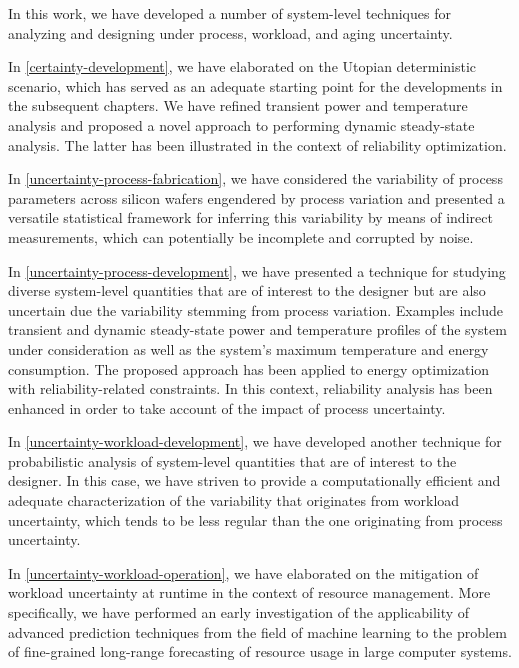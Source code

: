 In this work, we have developed a number of system-level techniques for
analyzing and designing under process, workload, and aging uncertainty.

In \cref{certainty-development}, we have elaborated on the Utopian deterministic
scenario, which has served as an adequate starting point for the developments in
the subsequent chapters. We have refined transient power and temperature
analysis and proposed a novel approach to performing dynamic steady-state
analysis. The latter has been illustrated in the context of reliability
optimization.

In \cref{uncertainty-process-fabrication}, we have considered the variability of
process parameters across silicon wafers engendered by process variation and
presented a versatile statistical framework for inferring this variability by
means of indirect measurements, which can potentially be incomplete and
corrupted by noise.

In \cref{uncertainty-process-development}, we have presented a technique for
studying diverse system-level quantities that are of interest to the designer
but are also uncertain due the variability stemming from process variation.
Examples include transient and dynamic steady-state power and temperature
profiles of the system under consideration as well as the system's maximum
temperature and energy consumption. The proposed approach has been applied to
energy optimization with reliability-related constraints. In this context,
reliability analysis has been enhanced in order to take account of the impact of
process uncertainty.

In \cref{uncertainty-workload-development}, we have developed another technique
for probabilistic analysis of system-level quantities that are of interest to
the designer. In this case, we have striven to provide a computationally
efficient and adequate characterization of the variability that originates from
workload uncertainty, which tends to be less regular than the one originating
from process uncertainty.

In \cref{uncertainty-workload-operation}, we have elaborated on the mitigation
of workload uncertainty at runtime in the context of resource management. More
specifically, we have performed an early investigation of the applicability of
advanced prediction techniques from the field of machine learning to the problem
of fine-grained long-range forecasting of resource usage in large computer
systems.
